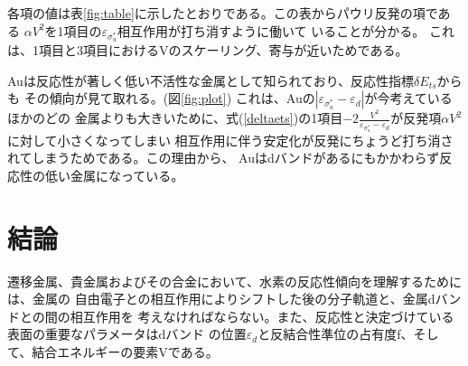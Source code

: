 \documentclass[12pt]{ltjsarticle}
\begin{document}
各項の値は表\ref{fig:table}に示したとおりである。この表からパウリ反発の項である
$\alpha V^2$を1項目の$\varepsilon _{\sigma_u^*}$相互作用が打ち消すように働いて
いることが分かる。
これは、1項目と3項目におけるVのスケーリング、寄与が近いためである。

Auは反応性が著しく低い不活性な金属として知られており、反応性指標$\delta E_{ts}$からも
その傾向が見て取れる。(図\ref{fig:plot})
これは、Auの$| \varepsilon _{\sigma_u^*} - \varepsilon _d|$が今考えているほかのどの
金属よりも大きいために、式(\ref{deltaets})の1項目$-2 \frac{ V^2 }{\varepsilon _
{\sigma_u^*} - \varepsilon _d}$が反発項$\alpha V^2$に対して小さくなってしまい
相互作用に伴う安定化が反発にちょうど打ち消されてしまうためである。この理由から、
Auはdバンドがあるにもかかわらず反応性の低い金属になっている。

\section{結論}
遷移金属、貴金属およびその合金において、水素の反応性傾向を理解するためには、金属の
自由電子との相互作用によりシフトした後の分子軌道と、金属dバンドとの間の相互作用を
考えなければならない。また、反応性と決定づけている表面の重要なパラメータはdバンド
の位置$\varepsilon_d$と反結合性準位の占有度f、そして、結合エネルギーの要素Vである。



\end{document}
